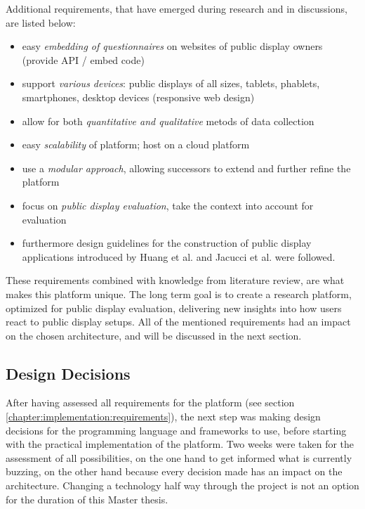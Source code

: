 	Additional requirements, that have emerged during research and in discussions, are listed below:

	\begin{itemize}[itemsep=0pt] 
	\item easy \textit{embedding of questionnaires} on websites of public display owners (provide API / embed code)
	\item support \textit{various devices}: public displays of all sizes, tablets, phablets, smartphones, desktop devices (responsive web design)
	\item allow for both \textit{quantitative and qualitative} metods of data collection
	\item easy \textit{scalability} of platform; host on a cloud platform
	\item use a \textit{modular approach}, allowing successors to extend and further refine the platform
	\item focus on \textit{public display evaluation}, take the context into account for evaluation
	\item furthermore design guidelines for the construction of public display applications introduced by Huang et al. \cite{huang2008overcoming} and Jacucci et al. \cite{jacucci2010worldsofinformation} were followed.
	\end{itemize}

	These requirements combined with knowledge from literature review, are what makes this platform unique. The long term goal is to create a research platform, optimized for public display evaluation, delivering new insights into how users react to public display setups. All of the mentioned requirements had an impact on the chosen architecture, and will be discussed in the next section.



\subsection{Design Decisions}
\label{chapter:implementation:design-decisions}

	After having assessed all requirements for the platform (see section \ref{chapter:implementation:requirements}), the next step was making design decisions for the programming language and frameworks to use, before starting with the practical implementation of the platform. 
	Two weeks were taken for the assessment of all possibilities, on the one hand to get informed what is currently buzzing, on the other hand because every decision made has an impact on the architecture. Changing a technology half way through the project is not an option for the duration of this Master thesis.


